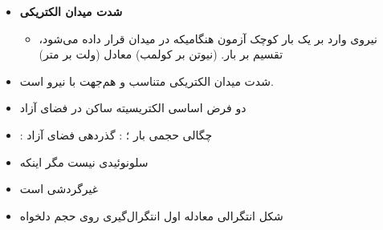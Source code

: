 \begin{ELjoin}

\begin{itemize}
\tightlist
\item
  \textbf{شدت میدان الکتریکی}

  \begin{itemize}
  \tightlist
  \item
    نیروی وارد بر یک بار کوچک آزمون هنگامیکه در میدان قرار داده می‌شود، تقسیم بر بار. \ELim{\ELto}  (نیوتن بر کولمب) معادل  (ولت بر متر)
  \end{itemize}
\end{itemize}

\begin{ELdefinition}{}


\end{ELdefinition}

\end{ELjoin}

\begin{ELjoin}

\begin{itemize}
\tightlist
\item
  شدت میدان الکتریکی متناسب و هم‌جهت با نیرو است.
\item
  دو فرض اساسی الکتریسیته ساکن در فضای آزاد
\end{itemize}

\begin{ELimportant}{}


\end{ELimportant}

\end{ELjoin}

\begin{ELunit}

\begin{itemize}
\item
  \ELim{\rho}: چگالی حجمی بار ؛ : گذردهی فضای آزاد 
\item
   سلونوئیدی نیست مگر اینکه 
\item
   غیرگردشی است
\item
  شکل انتگرالی معادله اول \ELim{\ELto} انتگرال‌گیری روی حجم دلخواه 
\end{itemize}


\end{ELunit}

